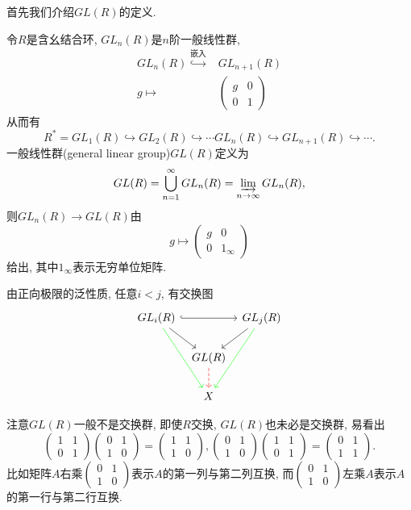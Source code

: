 首先我们介绍$GL(R)$的定义. 
\begin{definition}[一般线性群]
	令$R$是含幺结合环, $GL_n(R)$是$n$阶一般线性群, 
\begin{align*}
GL_n(R)\overset{\text{嵌入}}\hookrightarrow& GL_{n+1}(R) \\
g \mapsto& \begin{pmatrix}
	g & 0\\ 0 & 1
\end{pmatrix}
\end{align*}
从而有
\[R^*=GL_1(R)\hookrightarrow GL_2(R)\hookrightarrow \cdots GL_n(R) \hookrightarrow GL_{n+1}(R)\hookrightarrow \cdots.\]
一般线性群(general linear group)$GL(R)$定义为 
\[GL(R)=\bigcup_{n=1}^\infty GL_n(R)=\varinjlim_{n\to \infty} GL_n(R),\]
则$GL_n(R)\longrightarrow GL(R)$由
\[g \mapsto \begin{pmatrix}
		g & 0\\ 0 & 1_{\infty}
\end{pmatrix}\]
给出, 其中$1_{\infty}$表示无穷单位矩阵.
\end{definition}
由正向极限的泛性质, 任意$i<j$, 有交换图
\[\begin{tikzcd}[column sep=tiny]
GL_i(R)\arrow[rr, hook] \arrow[rd] \arrow[rdd,green] & & GL_j(R)\arrow[ld] \arrow[ldd,green]\\
& GL(R) \arrow[d,dashrightarrow,red] & \\
& X &
\end{tikzcd}\]


注意$GL(R)$一般不是交换群, 即使$R$交换, $GL(R)$也未必是交换群, 易看出
\[\begin{pmatrix}
	1 & 1\\ 0 & 1
\end{pmatrix}\begin{pmatrix}
	0 & 1\\ 1 & 0
\end{pmatrix}=\begin{pmatrix}
	1 & 1\\ 1 & 0
\end{pmatrix}, \begin{pmatrix}
	0 & 1\\ 1 & 0
\end{pmatrix}\begin{pmatrix}
	1 & 1\\ 0 & 1
\end{pmatrix}=\begin{pmatrix}
	0 & 1\\ 1 & 1
\end{pmatrix}.\]
比如矩阵$A$右乘$\begin{pmatrix}
	0 & 1\\ 1 & 0
\end{pmatrix}$表示$A$的第一列与第二列互换, 而$\begin{pmatrix}
	0 & 1\\ 1 & 0
\end{pmatrix}$左乘$A$表示$A$的第一行与第二行互换. 

